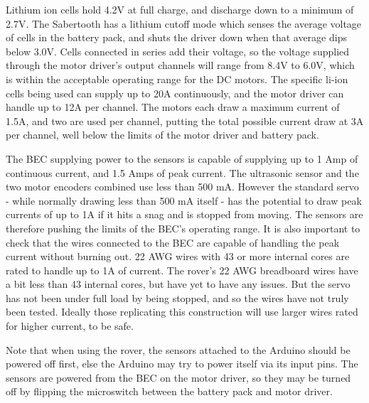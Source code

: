 Lithium ion cells hold 4.2V at full charge, and discharge down to a minimum of 2.7V. The Sabertooth has a lithium cutoff mode which senses the average voltage of cells in the battery pack, and shuts the driver down when that average dips below 3.0V. Cells connected in series add their voltage, so the voltage supplied through the motor driver's output channels will range from 8.4V to 6.0V, which is within the acceptable operating range for the DC motors. The specific li-ion cells being used can supply up to 20A continuously, and the motor driver can handle up to 12A per channel. The motors each draw a maximum current of 1.5A, and two are used per channel, putting the total possible current draw at 3A per channel, well below the limits of the motor driver and battery pack.

The BEC supplying power to the sensors is capable of supplying up to 1 Amp of continuous current, and 1.5 Amps of peak current. The ultrasonic sensor and the two motor encoders combined use less than 500 mA. However the standard servo - while normally drawing less than 500 mA itself -  has the potential to draw peak currents of up to 1A if it hits a snag and is stopped from moving. The sensors are therefore pushing the limits of the BEC's operating range. It is also important to check that the wires connected to the BEC are capable of handling the peak current without burning out. 22 AWG wires with 43 or more internal cores are rated to handle up to 1A of current. The rover's 22 AWG breadboard wires have a bit less than 43 internal cores, but have yet to have any issues. But the servo has not been under full load by being stopped, and so the wires have not truly been tested. Ideally those replicating this construction will use larger wires rated for higher current, to be safe.

Note that when using the rover, the sensors attached to the Arduino should be powered off first, else the Arduino may try to power itself via its input pins. The sensors are powered from the BEC on the motor driver, so they may be turned off by flipping the microswitch between the battery pack and motor driver.
